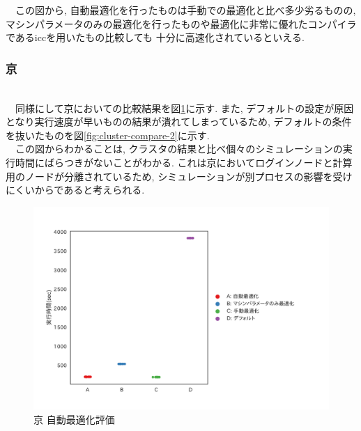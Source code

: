 　この図から, 自動最適化を行ったものは手動での最適化と比べ多少劣るものの,
マシンパラメータのみの最適化を行ったものや最適化に非常に優れたコンパイラであるiccを用いたもの比較しても
十分に高速化されているといえる.\\
\vspace{10cm}
\subsubsection{京}~\\
　同様にして京においての比較結果を図\ref{fig:k-compare}に示す. また, デフォルトの設定が原因となり実行速度が早いものの結果が潰れてしまっているため, デフォルトの条件を抜いたものを図\ref{fig:cluster-compare-2}に示す.\\
　この図からわかることは, クラスタの結果と比べ個々のシミュレーションの実行時間にばらつきがないことがわかる.
これは京においてログインノードと計算用のノードが分離されているため, シミュレーションが別プロセスの影響を受けにくいからであると考えられる.\\
\begin{figure}[htb]
 \begin{center}
    \includegraphics[width=14cm]{./images/k-compare.pdf}
    \caption{京 自動最適化評価}
    \label{fig:k-compare}
  \end{center}
\end{figure}~\\
